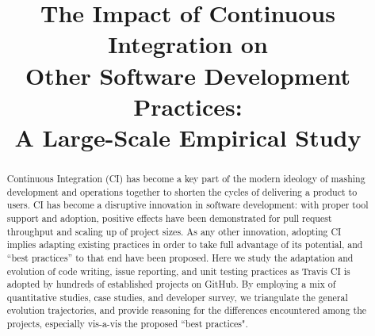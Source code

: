 \documentclass[10pt,conference]{IEEEtran}
\newcommand{\GH}{{\sc GitHub}\xspace}
\newcommand{\Tvis}{{\sc Travis CI}\xspace}
\newcommand\blfootnote[1]{%
  \begingroup
  \renewcommand\thefootnote{}\footnote{#1}%
  \addtocounter{footnote}{-1}%
  \endgroup
}
\begin{document}
\title{The Impact of Continuous Integration on \\Other Software 
Development Practices: \\A Large-Scale Empirical Study}


\maketitle
\begin{abstract}
Continuous Integration (CI)
has become a key part of the modern ideology 
of mashing development and operations together to shorten the cycles of 
delivering a product to users. 
CI has become a disruptive innovation in software development: with proper 
tool support and adoption, positive effects have been demonstrated for pull 
request throughput and scaling up of project sizes. 
As any other innovation, adopting CI implies adapting existing practices in 
order to take full advantage of its potential, and ``best practices'' to that end 
have been proposed. 
Here we study the adaptation and evolution of code writing, issue reporting, 
and unit testing practices as \Tvis is adopted by hundreds of established 
projects on \GH. 
By employing a mix of quantitative studies, case studies, and developer survey, we triangulate 
the general evolution trajectories, and provide reasoning for the differences 
encountered among the projects, especially vis-a-vis the proposed ``best 
practices".
\end{abstract}














\balance

\newpage


\end{document}
